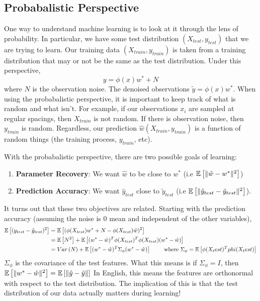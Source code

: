 \subsection{Probabalistic Perspective}
One way to understand machine learning is to look at it through the lens of probability. In particular, we have some test distribution $(X_{test}, y_{test})$ that we are trying to learn. Our training data $(X_{train}, y_{train})$ is taken from a training distribution that may or not be the same as the test distribution. Under this perspective,$$y = \phi(x)w^*+N$$ where $N$ is the observation noise. The denoised observations $\tilde{y} = \phi(x)w^*$. When using the probabalistic perspective, it is important to keep track of what is random and what isn't. For example, if our observations $x_i$ are sampled at regular spacings, then $X_{train}$ is not random. If there is observation noise, then $y_{train}$ is random. Regardless, our prediction $\hat{w}(X_{train}, y_{train})$ is a function of random things (the training process, $y_{train}$, etc).

With the probabalistic perspective, there are two possible goals of learning:
\begin{enumerate}
  \item \textbf{Parameter Recovery}: We want $\hat{w}$ to be close to $w^*$ (i.e $\mathbb{E}\left[\|\hat{w}-w^*\|^2\right]$)
  \item \textbf{Prediction Accuracy}: We want $\hat{y}_{test}$ close to $\tilde{y}_{test}$ (i.e $\mathbb{E}\left[\|\hat{y}_{test}-\tilde{y}_{test}\|^2\right]$).
\end{enumerate}
It turns out that these two objectives are related. Starting with the prediction accuracy (assuming the noise is 0 mean and independent of the other variables),
\begin{align*}
  \mathbb{E}\left[(y_{test}-\hat{y}_{test})^2\right] &= \mathbb{E}\left[(\phi(X_{test})w^*+N-\phi(X_{test})\hat{w})^2\right]\\
  &= \mathbb{E}\left[N^2\right]+\mathbb{E}\left[(w^*-\hat{w})^T\phi(X_{test})^T\phi(X_{test})(w^*-\hat{w})\right]\\
  &= Var\left(N\right)+\mathbb{E}\left[(w^*-\hat{w})^T\Sigma_\phi(w^*-\hat{w})\right]\qquad \text{ where } \Sigma_\phi=\mathbb{E}\left[\phi(X_test)^Tphi(X_test)\right]
\end{align*}
$\Sigma_\phi$ is the covariance of the test features. What this means is if $\Sigma_\phi=I$, then $\mathbb{E}\left[\|w^*-\hat{w}\|^2\right]=\mathbb{E}\left[\|\hat{y}-\tilde{y}\|\right]$
In English, this means the features are orthonormal with respect to the test distribution. The implication of this is that the test distribution of our data actually matters during learning! 
